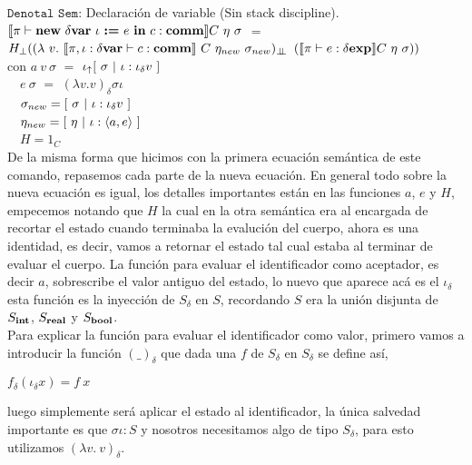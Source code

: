 \noindent
$\texttt{Denotal Sem:}$ Declaraci\'on de variable (Sin stack discipline).\\

$\llbracket \pi \vdash \textbf{new} \ \delta \textbf{var} \ \iota \ \textbf{:=} \ e \ \textbf{in} \ c : \textbf{comm} \rrbracket C \ \eta \ \sigma$ 
$=$ \\ \indent \indent
$H_{\bot} ((\lambda \ v . \ \semBrcks{\pi,\iota:\deltavar \vdash c : \commt}
		\ C \ \eta_{new} \ \sigma_{new})_{\dbot}$
$(\semBrcks{\pi \vdash e : \deltaexp}C \ \eta \ \sigma))$\\

con 
$a \ v \ \sigma$ $=$ $\iota_{\uparrow} [ \ \sigma \ | \ \iota:\iota_{\delta} v \ ] $\\
\indent \indent \ \
$e \ \sigma$ $=$ $(\lambda v . v)_{\delta}\sigma \iota$\\
\indent \indent \ \
$\sigma_{new} = [ \ \sigma \ | \ \iota:\iotadelta v \ ]$\\
\indent \indent \ \
$\eta_{new} = [ \ \eta \ | \ \iota:\lrangles{a,e} \ ]$\\
\indent \indent \ \
$H = 1_C$\\

De la misma forma que hicimos con la primera ecuaci\'on sem\'antica de este
comando, repasemos cada parte de la nueva ecuaci\'on. En general todo sobre 
la nueva ecuaci\'on es igual, los detalles importantes est\'an en las funciones
$a$, $e$ y $H$, empecemos notando que $H$ la cual
en la otra sem\'antica era al encargada de recortar el estado cuando terminaba 
la evaluci\'on del cuerpo, ahora es una identidad, es decir, vamos a retornar el
estado tal cual estaba al terminar de evaluar el cuerpo. La funci\'on para evaluar
el identificador como aceptador, es decir $a$, sobrescribe el valor antiguo del estado,
lo nuevo que aparece ac\'a es el $\iota_\delta$ esta funci\'on es la inyecci\'on
de $S_\delta$ en $S$, recordando $S$ era la uni\'on disjunta de $S_{\textbf{int}}$, 
$S_{\textbf{real}}$ y $S_{\textbf{bool}}$.\\
Para explicar la funci\'on para evaluar el identificador
como valor, primero vamos a introducir la funci\'on $(\_)_{\delta}$ que dada una $f$
de $S_\delta$ en $S_\delta$ se define as\'i,
\begin{center}
$f_{\delta}(\iota_{\delta}x) = f \ x$
\end{center}
luego simplemente ser\'a aplicar el estado al identificador, la \'unica 
salvedad importante es que $\sigma \iota : S$ y nosotros necesitamos algo de tipo
$S_\delta$, para esto utilizamos $(\lambda v. \ v)_\delta$.\\

